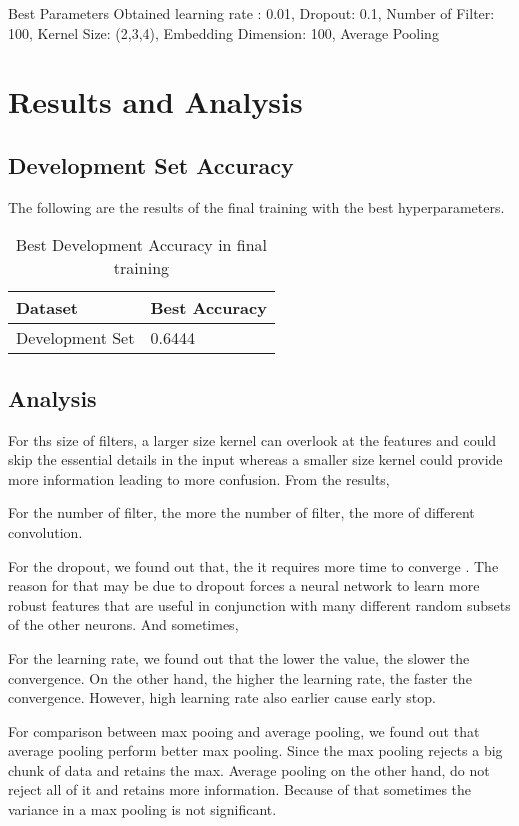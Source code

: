 \documentclass{article}
\begin{document}
Best Parameters Obtained { learning rate : 0.01, Dropout: 0.1, Number of Filter: 100, Kernel Size: (2,3,4),
 Embedding Dimension: 100, Average Pooling}

\pagebreak

\section{Results and Analysis}

\subsection{Development Set Accuracy}
The following are the results of the final training with the best hyperparameters.

\begin{table}[htb]
	\caption{Best Development Accuracy in final training}
	\label{sample-table}
	\centering
	\begin{tabular}{ll}
		\toprule
		\cmidrule{1-2}
		Dataset & Best Accuracy\\
		\midrule
		Development Set & 0.6444   \\
		\bottomrule
	\end{tabular}
\end{table}

\subsection{Analysis}
For ths size of filters, a larger size kernel can overlook at the features and could skip the essential details in the input whereas a smaller size kernel could provide more information leading to more confusion. From the results,

For the number of filter, the more the number of filter, the more of different convolution. 

For the dropout, we found out that, the it requires more time to converge . The reason for that may be due to dropout forces a neural network to learn more robust features that are useful in conjunction with many different random subsets of the other neurons. And sometimes, 

For the learning rate, we found out that the lower the value, the slower the convergence. On the other hand, the higher the learning rate, the faster the convergence. However, high learning rate also earlier cause early stop.

For comparison between max pooing and average pooling, we found out that average pooling perform better max pooling. Since the max pooling rejects a big chunk of data and retains the max. Average pooling on the other hand, do not reject all of it and retains more information. Because of that sometimes the variance in a max pooling is not significant.
\end{document}
